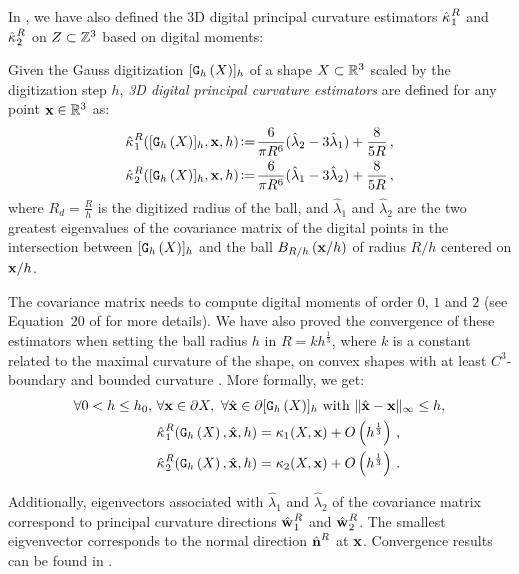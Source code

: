 \documentclass{llncs}
\begin{document}
In \cite{CVIU2014}, we have also defined the 3D digital principal curvature
estimators $\hat{\kappa_{}}_{1}^{R}$ and $\hat{\kappa_{}}_{2}^{R}$ on $Z\subset{\mathbb{Z}}^3$ based
on digital moments:
%
\begin{Definition}
  Given the Gauss digitization $\lbrack \mathtt{G}_{h}\left(X\right) \rbrack_{h}$ of a shape $X \subset {\mathbb{R}}^3$
  scaled by the digitization step $h$, {\em 3D digital principal curvature
  estimators} are defined for any point $\mathbf{x} \in {\mathbb{R}}^3$ as:
  \begin{align}
    \hat{\kappa_{}}_{1}^{R}(\lbrack \mathtt{G}_{h}\left(X\right) \rbrack_{h},\mathbf{x},h) &\!\mathrel{\mathop:}=\! \frac{6}{\pi {R}^6}(\hat{\lambda}_2 - 3\hat{\lambda}_1) + \frac{8}{5{{R}}} \,,\label{eq:dig-curvature-estimator-k1}\\
    \hat{\kappa_{}}_{2}^{R}(\lbrack \mathtt{G}_{h}\left(X\right) \rbrack_{h},\mathbf{x},h) &\!\mathrel{\mathop:}=\! \frac{6}{\pi {R}^6}(\hat{\lambda}_1 - 3\hat{\lambda}_2) + \frac{8}{5{{R}}} \,,
    \label{eq:dig-curvature-estimator-k2}
  \end{align}
  where $R_d = \frac{R}{h}$ is the digitized radius of the ball, and
  $\hat{\lambda}_1$ and $\hat{\lambda}_2$ are the two greatest eigenvalues of
  the covariance matrix of the digital points in the intersection between
  $\lbrack \mathtt{G}_{h}\left(X\right) \rbrack_{h}$ and the ball $B_{R/h}\left(\mathbf{x}/h\right)$ of radius $R/h$ centered on
  $\mathbf{x}/h$.
\end{Definition}
%
The covariance matrix needs to compute digital moments of order $0$, $1$ and $2$
(see Equation~20 of \cite{CVIU2014} for more details). We have also proved the
convergence of these estimators when setting the ball radius $h$ in $R =
kh^\frac{1}{3}$, where $k$ is a constant related to the maximal curvature of the
shape, on convex shapes with at least $C^3$-boundary and bounded curvature
\cite{CVIU2014}. More formally, we get:
%
\begin{align}
  \forall 0 < h \le h_0,\,\, &\forall \mathbf{x} \in \partial X,\,\,
  \forall \hat{\mathbf{x}} \in \partial \lbrack \mathtt{G}_{h}\left(X\right) \rbrack_{h} \text{~with~} \| \hat{\mathbf{x}} -\mathbf{x}\|_\infty \le h, \nonumber \\
  &\hat{\kappa_{}}_{1}^{R}(\mathtt{G}_{h}\left(X\right),\hat{\mathbf{x}}, h) = \kappa_{1}(X,\mathbf{x}) + O\left(h^{\frac{1}{3}}\right) \,,\\
  &\hat{\kappa_{}}_{2}^{R}(\mathtt{G}_{h}\left(X\right),\hat{\mathbf{x}}, h) = \kappa_{2}(X,\mathbf{x}) + O\left(h^{\frac{1}{3}}\right) \,.
\end{align}

Additionally, eigenvectors associated with $\hat{\lambda}_1$ and
$\hat{\lambda}_2$ of the covariance matrix correspond to principal curvature
directions $\hat{\mathbf{w}_{}}_{1}^{R}$ and $\hat{\mathbf{w}_{}}_{2}^{R}$. The smallest eigvenvector
corresponds to the normal direction $\hat{\mathbf{n}{}}^{R}$ at $\mathbf{x}$. Convergence
results can be found in \cite{ChapterIICurvature}.
\end{document}
